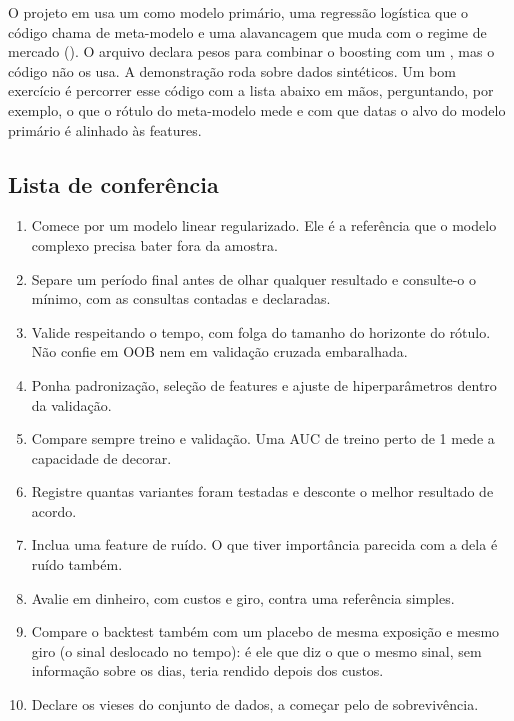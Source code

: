 \begin{repositorio}
O projeto em  usa um  como modelo primário, uma regressão logística que o código chama de meta-modelo e uma alavancagem que muda com o regime de mercado (). O arquivo  declara pesos para combinar o boosting com um , mas o código não os usa. A demonstração roda sobre dados sintéticos. Um bom exercício é percorrer esse código com a lista abaixo em mãos, perguntando, por exemplo, o que o rótulo do meta-modelo mede e com que datas o alvo do modelo primário é alinhado às features.
\end{repositorio}

\subsection{Lista de conferência}

\begin{enumerate}
  \item Comece por um modelo linear regularizado. Ele é a referência que o modelo complexo precisa bater fora da amostra.
  \item Separe um período final antes de olhar qualquer resultado e consulte-o o mínimo, com as consultas contadas e declaradas.
  \item Valide respeitando o tempo, com folga do tamanho do horizonte do rótulo. Não confie em OOB nem em validação cruzada embaralhada.
  \item Ponha padronização, seleção de features e ajuste de hiperparâmetros dentro da validação.
  \item Compare sempre treino e validação. Uma AUC de treino perto de 1 mede a capacidade de decorar.
  \item Registre quantas variantes foram testadas e desconte o melhor resultado de acordo.
  \item Inclua uma feature de ruído. O que tiver importância parecida com a dela é ruído também.
  \item Avalie em dinheiro, com custos e giro, contra uma referência simples.
  \item Compare o backtest também com um placebo de mesma exposição e mesmo giro (o sinal deslocado no tempo): é ele que diz o que o mesmo sinal, sem informação sobre os dias, teria rendido depois dos custos.
  \item Declare os vieses do conjunto de dados, a começar pelo de sobrevivência.
\end{enumerate}

